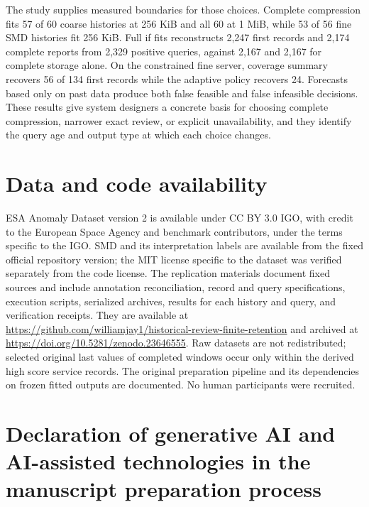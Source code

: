 \documentclass[a4paper,fleqn]{cas-dc}
\begin{document}
The study supplies measured boundaries for those choices. Complete compression fits 57 of 60 coarse histories at 256 KiB and all 60 at 1 MiB, while 53 of 56 fine SMD histories fit 256 KiB. Full if fits reconstructs 2{,}247 first records and 2{,}174 complete reports from 2{,}329 positive queries, against 2{,}167 and 2{,}167 for complete storage alone. On the constrained fine server, coverage summary recovers 56 of 134 first records while the adaptive policy recovers 24. Forecasts based only on past data produce both false feasible and false infeasible decisions. These results give system designers a concrete basis for choosing complete compression, narrower exact review, or explicit unavailability, and they identify the query age and output type at which each choice changes.

\section*{Data and code availability}

ESA Anomaly Dataset version 2 is available under CC BY 3.0 IGO, with credit to the European Space Agency and benchmark contributors, under the terms specific to the IGO. SMD and its interpretation labels are available from the fixed official repository version; the MIT license specific to the dataset was verified separately from the code license. The replication materials document fixed sources and include annotation reconciliation, record and query specifications, execution scripts, serialized archives, results for each history and query, and verification receipts. They are available at \url{https://github.com/williamjay1/historical-review-finite-retention} and archived at \url{https://doi.org/10.5281/zenodo.23646555}. Raw datasets are not redistributed; selected original last values of completed windows occur only within the derived high score service records. The original preparation pipeline and its dependencies on frozen fitted outputs are documented. No human participants were recruited.

\section*{Declaration of generative AI and AI-assisted technologies in the manuscript preparation process}
\end{document}
